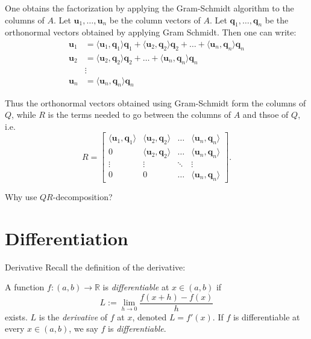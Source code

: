 \documentclass [aspectratio=169]{beamer}
\newcommand{\bu}{{\mathbf{u}}}
\newcommand{\innerprod}[1]{\langle #1 \rangle}
\newcommand{\R}{{\mathbb{R}}}
\begin{document}
\begin{frame}
One obtains the factorization by applying the Gram-Schmidt algorithm to the columns of $A$. Let $\bu_1, \ldots, \bu_n$ be the column vectors of $A$. Let $\mathbf{q}_1, \ldots, \mathbf{q}_n$ be the orthonormal vectors obtained by applying Gram Schmidt. Then one can write:
\begin{align*}
    \bu_1 &= \innerprod{\bu_1,\mathbf{q}_1}\mathbf{q}_1 + \innerprod{\bu_2,\mathbf{q}_2}\mathbf{q}_2+ \ldots +  \innerprod{\bu_n,\mathbf{q}_n} \mathbf{q}_n \\
    \bu_2 &= \innerprod{\bu_2,\mathbf{q}_2}\mathbf{q}_2 + \ldots +  \innerprod{\bu_n,\mathbf{q}_n} \mathbf{q}_n \\
    & \vdots \\
    \bu_n &=  \innerprod{\bu_n,\mathbf{q}_n} \mathbf{q}_n
\end{align*}

Thus the orthonormal vectors obtained using Gram-Schmidt form the columns of $Q$, while $R$ is the terms needed to go between the columns of $A$ and thsoe of $Q$, i.e.
$$ R = \begin{bmatrix}
\innerprod{\bu_1,\mathbf{q}_1} & \innerprod{\bu_2,\mathbf{q}_2} & \ldots & \innerprod{\bu_n,\mathbf{q}_n} \\
0 & \innerprod{\bu_2,\mathbf{q}_2} & \ldots & \innerprod{\bu_n,\mathbf{q}_n} \\
\vdots &\vdots & \ddots & \vdots \\
0 & 0 & \ldots & \innerprod{\bu_n,\mathbf{q}_n} 
\end{bmatrix}.$$
\end{frame}

\begin{frame}
Why use $QR$-decomposition? 

\vspace{3cm}

\end{frame}



\section{Differentiation}

\begin{frame}{Derivative}
Recall the definition of the derivative:
\begin{definition}
A function $f:(a,b) \to \R$ is \emph{differentiable} at $x\in (a,b)$ if
\begin{equation*}
    L := \lim_{h \to 0} \frac{f(x+h) - f(x)}{h}
\end{equation*}
exists. $L$ is the \emph{derivative} of $f$ at $x$, denoted $L= f'(x)$. If $f$ is differentiable at every $x \in (a,b)$, we say $f$ is \emph{differentiable}.
\end{definition}
\end{frame}
\end{document}

